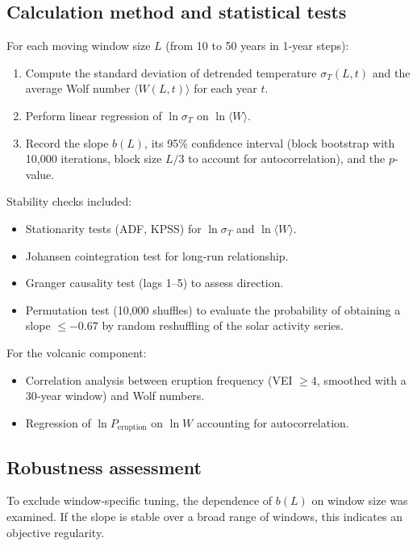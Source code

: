 \documentclass[12pt,a4paper]{article}
\begin{document}
	\subsection{Calculation method and statistical tests}
	
	For each moving window size \(L\) (from 10 to 50 years in 1‑year steps):
	\begin{enumerate}
		\item Compute the standard deviation of detrended temperature \(\sigma_T(L,t)\) and the average Wolf number \(\langle W(L,t) \rangle\) for each year \(t\).
		\item Perform linear regression of \(\ln \sigma_T\) on \(\ln \langle W \rangle\).
		\item Record the slope \(b(L)\), its 95\% confidence interval (block bootstrap with 10,000 iterations, block size \(L/3\) to account for autocorrelation), and the \(p\)-value.
	\end{enumerate}
	
	Stability checks included:
	\begin{itemize}
		\item Stationarity tests (ADF, KPSS) for \(\ln \sigma_T\) and \(\ln \langle W \rangle\).
		\item Johansen cointegration test for long‑run relationship.
		\item Granger causality test (lags 1–5) to assess direction.
		\item Permutation test (10,000 shuffles) to evaluate the probability of obtaining a slope \(\le -0.67\) by random reshuffling of the solar activity series.
	\end{itemize}
	
	For the volcanic component:
	\begin{itemize}
		\item Correlation analysis between eruption frequency (VEI \(\ge 4\), smoothed with a 30‑year window) and Wolf numbers.
		\item Regression of \(\ln P_{\text{eruption}}\) on \(\ln W\) accounting for autocorrelation.
	\end{itemize}
	
	\subsection{Robustness assessment}
	
	To exclude window‑specific tuning, the dependence of \(b(L)\) on window size was examined. If the slope is stable over a broad range of windows, this indicates an objective regularity.
	
\end{document}
